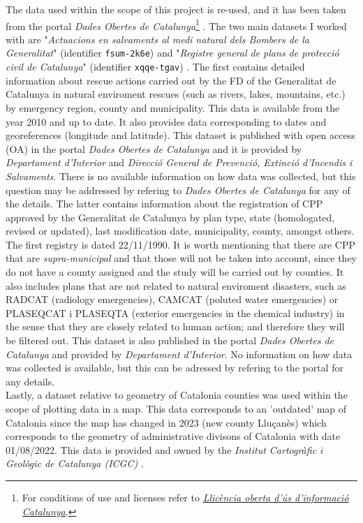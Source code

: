 \documentclass[
  journal=small,
  manuscript=mini-article,  %
  year=2023,
  volume=1,
]{odj-journal}
\begin{document}
The data used within the scope of this project is re-used, and it has been taken from the portal \textit{Dades Obertes de Catalunya}\footnote{For conditions of use and licenses refer to \href{https://governobert.gencat.cat/ca/dades_obertes/llicencia-oberta-informacio-catalunya/}{\textit{Llicència oberta d'ús d'informació Catalunya}}.} \cite{dades_obertes}. The two main datasets I worked with are "\textit{Actuacions en salvaments al medi natural dels Bombers de la Generalitat}" (identifier \texttt{fsum-2k6e}) \cite{fd_rescue} and "\textit{Registre general de plans de protecció civil de Catalunya}" (identifier \texttt{xqqe-tgav}) \cite{CPP}. The first contains detailed information about rescue actions carried out by the FD of the Generalitat de Catalunya in natural enviroment rescues (such as rivers, lakes, mountains, etc.) by emergency region, county and municipality. This data is available from the year 2010 and up to date. It also provides data corresponding to dates and georeferences (longitude and latitude). This dataset is published with open access (OA) in the portal \textit{Dades Obertes de Catalunya} and it is provided by \textit{Departament d'Interior} and \textit{Direcció General de Prevenció, Extinció d'Incendis i Salvaments}. There is no available information on how data was collected, but this question may be addressed by refering to \textit{Dades Obertes de Catalunya} for any of the details. The latter contains information about the registration of CPP approved by the Generalitat de Catalunya by plan type, state (homologated, revised or updated), last modification date, municipality, county, amongst others. The first registry is dated 22/11/1990. It is worth mentioning that there are CPP that are \textit{supra-municipal} and that those will not be taken into account, since they do not have a county assigned and the study will be carried out by counties. It also includes plans that are not related to natural enviroment disasters, such as RADCAT (radiology emergencies), CAMCAT (poluted water emergencies) or PLASEQCAT i PLASEQTA (exterior emergencies in the chemical industry) in the sense that they are closely related to human action; and therefore they will be filtered out. This dataset is also published in the portal \textit{Dades Obertes de Catalunya} and provided by \textit{Departament d'Interior}. No information on how data was collected is available, but this can be adressed by refering to the portal for any details.\\

Lastly, a dataset relative to geometry of Catalonia counties was used within the scope of plotting data in a map. This data corresponds to an 'outdated' map of Catalonia since the map has changed in 2023 (new county Lluçanès) which corresponds to the geometry of administrative divisons of Catalonia with date 01/08/2022. This data is provided and owned by the \textit{Institut Cartogràfic i Geològic de Catalunya (ICGC)} \cite{geo_dades}. 
\end{document}
